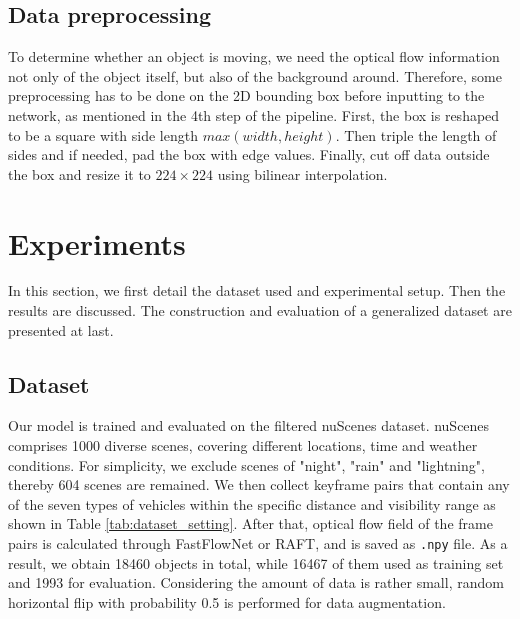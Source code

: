 \documentclass[10pt, a4paper, twocolumn]{article}
\begin{document}
\subsection{\normalsize Data preprocessing}

    To determine whether an object is moving, we need the optical flow information not only of the object itself, but also of the background around. Therefore, some preprocessing has to be done on the 2D bounding box before inputting to the network, as mentioned in the 4th step of the pipeline. First, the box is reshaped to be a square with side length $\bm{}{max}(width, height)$. Then triple the length of sides and if needed, pad the box with edge values. Finally, cut off data outside the box and resize it to $224\times224$ using bilinear interpolation.


\section{\large Experiments}

    In this section, we first detail the dataset used and experimental setup. Then the results are discussed. The construction and evaluation of a generalized dataset are presented at last.

\subsection{\normalsize Dataset}

    Our model is trained and evaluated on the filtered nuScenes \cite{nuscenes2019} dataset. nuScenes comprises 1000 diverse scenes, covering different locations, time and weather conditions. For simplicity, we exclude scenes of "night", "rain" and "lightning", thereby 604 scenes are remained. We then collect keyframe pairs that contain any of the seven types of vehicles within the specific distance and visibility range as shown in Table \ref{tab:dataset_setting}. After that, optical flow field of the frame pairs is calculated through FastFlowNet or RAFT, and is saved as \texttt{.npy} file. As a result, we obtain 18460 objects in total, while 16467 of them used as training set and 1993 for evaluation. Considering the amount of data is rather small, random horizontal flip with probability 0.5 is performed for data augmentation.
    
\end{document}
